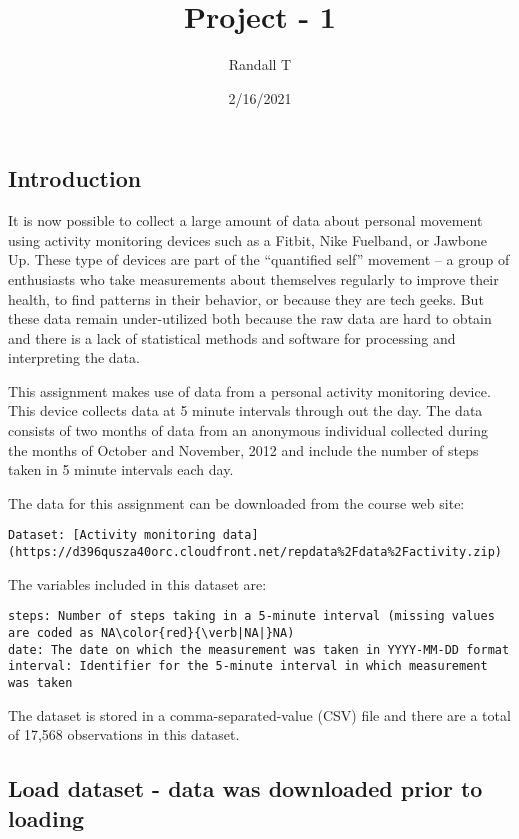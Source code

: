 \documentclass[
]{article}
\title{Project - 1}
\author{Randall T}
\date{2/16/2021}
\begin{document}
\maketitle

\hypertarget{introduction}{%
\subsection{Introduction}\label{introduction}}

It is now possible to collect a large amount of data about personal
movement using activity monitoring devices such as a Fitbit, Nike
Fuelband, or Jawbone Up. These type of devices are part of the
``quantified self'' movement -- a group of enthusiasts who take
measurements about themselves regularly to improve their health, to find
patterns in their behavior, or because they are tech geeks. But these
data remain under-utilized both because the raw data are hard to obtain
and there is a lack of statistical methods and software for processing
and interpreting the data.

This assignment makes use of data from a personal activity monitoring
device. This device collects data at 5 minute intervals through out the
day. The data consists of two months of data from an anonymous
individual collected during the months of October and November, 2012 and
include the number of steps taken in 5 minute intervals each day.

The data for this assignment can be downloaded from the course web site:

\begin{verbatim}
Dataset: [Activity monitoring data](https://d396qusza40orc.cloudfront.net/repdata%2Fdata%2Factivity.zip)
\end{verbatim}

The variables included in this dataset are:

\begin{verbatim}
steps: Number of steps taking in a 5-minute interval (missing values are coded as NA\color{red}{\verb|NA|}NA)
date: The date on which the measurement was taken in YYYY-MM-DD format
interval: Identifier for the 5-minute interval in which measurement was taken
\end{verbatim}

The dataset is stored in a comma-separated-value (CSV) file and there
are a total of 17,568 observations in this dataset.

\hypertarget{load-dataset---data-was-downloaded-prior-to-loading}{%
\subsection{Load dataset - data was downloaded prior to
loading}\label{load-dataset---data-was-downloaded-prior-to-loading}}
\end{document}
